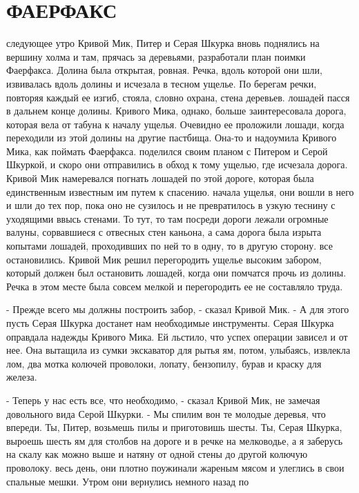 \chapter{ФАЕРФАКС}
\par{} следующее утро Кривой Мик, Питер и Серая Шкурка вновь поднялись 
на вершину холма и там, прячась за деревьями, разработали план поимки 
Фаерфакса. Долина была открытая, ровная. Речка, вдоль которой они шли, 
извивалась вдоль долины и исчезала в тесном ущелье. По берегам речки, 
повторяя каждый ее изгиб, стояла, словно охрана, стена деревьев.
 лошадей пасся в дальнем конце долины. Кривого Мика, однако, 
больше заинтересовала дорога, которая вела от табуна к началу ущелья. 
Очевидно ее проложили лошади, когда переходили из этой долины на 
другие пастбища. Она-то и надоумила Кривого Мика, как поймать 
Фаерфакса.
 поделился своим планом с Питером и Серой Шкуркой, и скоро они 
отправились в обход к тому ущелью, где исчезала дорога. Кривой Мик 
намеревался погнать лошадей по этой дороге, которая была единственным 
известным им путем к спасению.
 начала ущелья, они вошли в него и шли до тех пор, пока 
оно не сузилось и не превратилось в узкую теснину с уходящими ввысь 
стенами. То тут, то там посреди дороги лежали огромные валуны, 
сорвавшиеся с отвесных стен каньона, а сама дорога была изрыта 
копытами лошадей, проходивших по ней то в одну, то в другую сторону.
 все остановились. Кривой Мик решил перегородить ущелье 
высоким забором, который должен был остановить лошадей, когда они 
помчатся прочь из долины. Речка в этом месте была совсем мелкой и 
перегородить ее не составляло труда.
\par- Прежде всего мы должны построить забор, - сказал Кривой Мик. - А 
для этого пусть Серая Шкурка достанет нам необходимые инструменты. 
Серая Шкурка оправдала надежды Кривого Мика. Ей льстило, что успех 
операции зависел и от нее. Она вытащила из сумки экскаватор для рытья 
ям, потом, улыбаясь, извлекла лом, два мотка колючей проволоки, 
лопату, бензопилу, бурав и краску для железа.
\par- Теперь у нас есть все, что необходимо, - сказал Кривой Мик, не 
замечая довольного вида Серой Шкурки. - Мы спилим вон те молодые 
деревья, что впереди. Ты, Питер, возьмешь пилы и приготовишь шесты. 
Ты, Серая Шкурка, выроешь шесть ям для столбов на дороге и в речке на 
мелководье, а я заберусь на скалу как можно выше и натяну от одной 
стены до другой колючую проволоку.
 весь день, они плотно поужинали жареным мясом и 
улеглись в свои спальные мешки. Утром они вернулись немного назад по 

